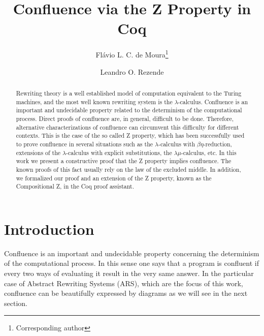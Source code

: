 \documentclass[a4paper,UKenglish,cleveref, autoref, thm-restate,authorcolumns]{lipics-v2019}
\title{Confluence via the Z Property in Coq}
\author{Flávio L. C. de Moura\footnote{Corresponding author}}{Departamento de Ci\^encia da Computacao, Universidade de Brasilia \and
  \url{http://flaviomoura.mat.br}
}{flaviomoura@unb.br}{https://orcid.org/0000-0002-9390-5751}{}
\author{Leandro O. Rezende}{Departamento de }{L-ordo.ab.chao@hotmail.com}{}{}
\begin{document}
\maketitle

\begin{abstract}
  Rewriting theory is a well established model of computation
  equivalent to the Turing machines, and the most well known rewriting
  system is the $\lambda$-calculus. Confluence is an important and
  undecidable property related to the determinism of the computational
  process. Direct proofs of confluence are, in general, difficult to
  be done. Therefore, alternative characterizations of confluence can
  circumvent this difficulty for different contexts. This is the case
  of the so called Z property, which has been successfully used to
  prove confluence in several situations such as the
  $\lambda$-calculus with $\beta\eta$-reduction, extensions of the
  $\lambda$-calculus with explicit substitutions, the
  $\lambda\mu$-calculus, etc. In this work we present a constructive
  proof that the Z property implies confluence. The known proofs of
  this fact usually rely on the law of the excluded middle. In
  addition, we formalized our proof and an extension of the Z
  property, known as the Compositional Z, in the Coq proof assistant.
\end{abstract}

\section{Introduction}



Confluence is an important and undecidable property concerning the
determinism of the computational process. In this sense one says that
a program is confluent if every two ways of evaluating it result in
the very same answer. In the particular case of Abstract Rewriting
Systems (ARS), which are the focus of this work, confluence can be
beautifully expressed by diagrams as we will see in the next section.
\end{document}
